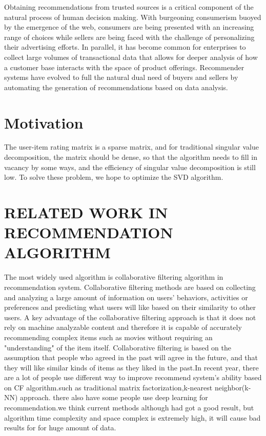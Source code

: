 \documentclass{acmtog} %
\begin{document}
Obtaining recommendations from trusted sources is a critical component of the natural process of human decision making. With burgeoning consumerism buoyed by the emergence of the web, consumers are being presented with an increasing range of choices while sellers are being faced with the challenge of personalizing their advertising efforts. In parallel, it has become common for enterprises to collect large volumes of transactional data that allows for deeper analysis of how a customer base interacts with the space of product offerings. Recommender systems have evolved to full the natural dual need of buyers and sellers by automating the generation of recommendations based on data analysis.

\section{Motivation}
The user-item rating matrix is a sparse matrix, and for traditional singular value decomposition, the matrix should be dense, so that the algorithm needs to fill in vacancy by some ways, and the efficiency of singular value decomposition is still low. To solve these problem, we hope to optimize the SVD algorithm.
\section{RELATED WORK IN RECOMMENDATION ALGORITHM}
 The most widely used algorithm is collaborative filtering algorithm in recommendation system. Collaborative filtering methods are based on collecting and analyzing a large amount of information on users’ behaviors, activities or preferences and predicting what users will like based on their similarity to other users. A key advantage of the collaborative filtering approach is that it does not rely on machine analyzable content and therefore it is capable of accurately recommending complex items such as movies without requiring an "understanding" of the item itself. Collaborative filtering is based on the assumption that people who agreed in the past will agree in the future, and that they will like similar kinds of items as they liked in the past.In recent year, there are a lot of people use different way to improve recommend system's ability based on CF algorithm.such as traditional matrix factorization,k-nearest neighbor(k-NN) approach. there also have some people use deep learning  for recommendation.we think current methods although had got a good result, but algorithm time complexity and space complex is extremely high, it will cause bad results for for huge amount of  data.
\end{document}
